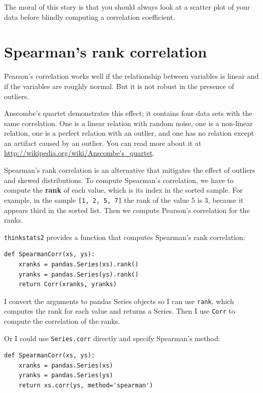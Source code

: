 \documentclass[12pt]{book}
\begin{document}
The moral of this story is that you should always look at a scatter
plot of your data before blindly computing a correlation coefficient.
 


\section{Spearman's rank correlation}

Pearson's correlation works well if the relationship between variables
is linear and if the variables are roughly normal.  But it is not
robust in the presence of outliers.

Anscombe's quartet demonstrates this effect; it contains four data
sets with the same correlation.  One is a linear relation with random
noise, one is a non-linear relation, one is a perfect relation with an
outlier, and one has no relation except an artifact caused by an
outlier.  You can read more about it at
\url{http://wikipedia.org/wiki/Anscombe's_quartet}.

Spearman's rank correlation is an alternative that mitigates the
effect of outliers and skewed distributions.  To compute Spearman's
correlation, we have to compute the {\bf rank} of each value, which is its
index in the sorted sample.  For example, in the sample {\tt [1, 2, 5, 7]}
the rank of the value 5 is 3, because it appears third in the sorted
list.  Then we compute Pearson's correlation for the ranks.

{\tt thinkstats2} provides a function that computes Spearman's rank
correlation:

\begin{verbatim}
def SpearmanCorr(xs, ys):
    xranks = pandas.Series(xs).rank()
    yranks = pandas.Series(ys).rank()
    return Corr(xranks, yranks)
\end{verbatim}

I convert the arguments to pandas Series objects so I can use
{\tt rank}, which computes the rank for each value and returns
a Series.  Then I use {\tt Corr} to compute the correlation
of the ranks.

Or I could use {\tt Series.corr} directly and specify
Spearman's method:

\begin{verbatim}
def SpearmanCorr(xs, ys):
    xranks = pandas.Series(xs)
    yranks = pandas.Series(ys)
    return xs.corr(ys, method='spearman')
\end{verbatim}
\end{document}
